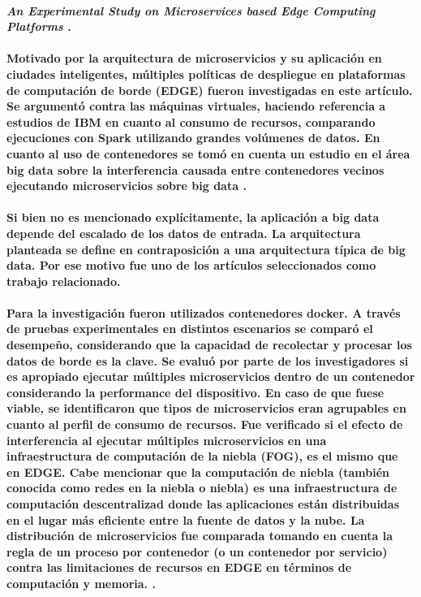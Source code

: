 \paragraph{
\textbf{\emph{An Experimental Study on Microservices based Edge Computing Platforms}}
\cite{qu_experimental_2020}.
}

\paragraph{
Motivado por la arquitectura de microservicios y su aplicación en ciudades inteligentes,
múltiples políticas de despliegue en plataformas de computación de borde (EDGE) fueron investigadas en este artículo. Se argumentó contra las máquinas virtuales, haciendo referencia a estudios de IBM en cuanto al consumo de recursos, comparando ejecuciones con Spark \cite{ApacheSpark} utilizando grandes volúmenes de datos. En cuanto al uso de contenedores se tomó en cuenta un estudio en el área big data sobre la interferencia causada entre contenedores vecinos ejecutando microservicios sobre big data \cite{BigDataWikipedia}.  
}

\paragraph{
Si bien no es mencionado explícitamente, la aplicación a big data depende del escalado de los datos de entrada. La arquitectura planteada se define en contraposición a una arquitectura típica de big data. Por ese motivo fue uno de los artículos seleccionados como trabajo relacionado.
}

\paragraph{
Para la investigación fueron utilizados contenedores docker. A través de pruebas experimentales en distintos escenarios se comparó el desempeño, considerando que la capacidad de recolectar y procesar los datos de borde es la clave.
Se evaluó por parte de los investigadores si es apropiado ejecutar múltiples microservicios dentro de un contenedor considerando la performance del dispositivo.
En caso de que fuese viable, se identificaron que tipos de microservicios eran agrupables en cuanto al perfil de consumo de recursos.
Fue verificado si el efecto de interferencia al ejecutar múltiples microservicios en una infraestructura de computación de la niebla (FOG), es el mismo que en EDGE. Cabe mencionar que la computación de niebla (también conocida como redes en la niebla o niebla)
es una infraestructura de computación descentralizad donde las aplicaciones están distribuidas en el lugar más eficiente entre la fuente de datos y la nube.
La distribución de microservicios fue comparada tomando en cuenta la regla de un proceso por contenedor (o un contenedor por servicio) 
\cite{cont_por_serv} 
contra las limitaciones de recursos en EDGE en términos de computación y memoria.
\cite{webfog}.
}

